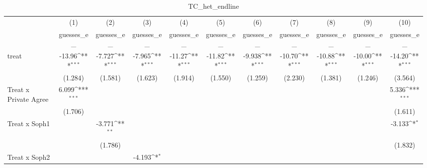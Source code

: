 \begin{table}[htbp]\centering
\def\sym#1{\ifmmode^{#1}\else\(^{#1}\)\fi}
\caption{TC\_het\_endline}
\begin{tabular}{l*{10}{c}}
\hline\hline
                                &\multicolumn{1}{c}{(1)}&\multicolumn{1}{c}{(2)}&\multicolumn{1}{c}{(3)}&\multicolumn{1}{c}{(4)}&\multicolumn{1}{c}{(5)}&\multicolumn{1}{c}{(6)}&\multicolumn{1}{c}{(7)}&\multicolumn{1}{c}{(8)}&\multicolumn{1}{c}{(9)}&\multicolumn{1}{c}{(10)}\\
                                &\multicolumn{1}{c}{guesses\_e\_}&\multicolumn{1}{c}{guesses\_e\_}&\multicolumn{1}{c}{guesses\_e\_}&\multicolumn{1}{c}{guesses\_e\_}&\multicolumn{1}{c}{guesses\_e\_}&\multicolumn{1}{c}{guesses\_e\_}&\multicolumn{1}{c}{guesses\_e\_}&\multicolumn{1}{c}{guesses\_e\_}&\multicolumn{1}{c}{guesses\_e\_}&\multicolumn{1}{c}{guesses\_e\_}\\
\hline
treat                           &   -13.96\sym{***}&   -7.727\sym{***}&   -7.965\sym{***}&   -11.27\sym{***}&   -11.82\sym{***}&   -9.938\sym{***}&   -10.70\sym{***}&   -10.88\sym{***}&   -10.00\sym{***}&   -14.20\sym{***}\\
                                &  (1.284)         &  (1.581)         &  (1.623)         &  (1.914)         &  (1.550)         &  (1.259)         &  (2.230)         &  (1.381)         &  (1.246)         &  (3.564)         \\
Treat x Private Agree           &    6.099\sym{***}&                  &                  &                  &                  &                  &                  &                  &                  &    5.336\sym{***}\\
                                &  (1.706)         &                  &                  &                  &                  &                  &                  &                  &                  &  (1.611)         \\
Treat x Soph1                   &                  &   -3.771\sym{**} &                  &                  &                  &                  &                  &                  &                  &   -3.133\sym{*}  \\
                                &                  &  (1.786)         &                  &                  &                  &                  &                  &                  &                  &  (1.832)         \\
Treat x Soph2                   &                  &                  &   -4.193\sym{*}  &                  &                  &                  &                  &                  &                  &                  \\

\end{tabular}
\end{table}
